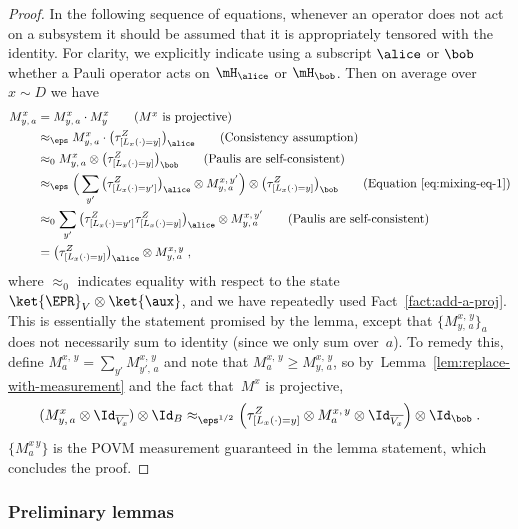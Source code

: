 \begin{proof}
	In the following sequence of equations, whenever an operator does not act on a
  subsystem it should be assumed that it is appropriately tensored with the
  identity.
  For clarity, we explicitly indicate using a subscript $\alice$ or $\bob$
  whether a Pauli operator acts on $\mH_\alice$ or $\mH_\bob$.
  Then on average over $x\sim D$ we have
  \begin{align*}
    M^{x}_{y, \, a}
    & =  M^{x}_{y, \, a} \cdot M^{x}_y  \tag{$M^x$ is projective}\\
    & \approx_\eps  M^{x}_{y, \, a} \cdot \big(
      \tau^Z_{[L_x(\cdot)=y]}\big)_\alice
      \tag{Consistency assumption}\\
    & \approx_0 M^x_{y, \, a} \otimes \big(\tau^Z_{[L_x(\cdot)=y]}\big)_\bob
      \tag{Paulis are self-consistent}\\
    & \approx_\eps \Big( \sum_{y'} \big(\tau^Z_{[L_x(\cdot) = y']}\big)_\alice
      \otimes  M^{x,\, y'}_{y,\, a} \Big) \otimes \big(\tau^Z_{[L_x(\cdot)=y]}
      \big)_\bob \tag{Equation~\eqref{eq:mixing-eq-1}}\\
    & \approx_0 \sum_{y'} \big(\tau^Z_{[L_x(\cdot) =
      y']}\tau^Z_{[L_x(\cdot)=y]}\big)_\alice \otimes  M^{x,\, y'}_{y,\, a}
      \tag{Paulis are self-consistent} \\
    & = \big( \tau^Z_{[L_x(\cdot) = y]} \big)_\alice
      \otimes M^{x,\, y}_{y,\, a} \;,
  \end{align*}
  where $\approx_0$ indicates equality with respect to the state $\ket{\EPR}_{V}
  \otimes \ket{\aux}$, and we have repeatedly used Fact~\ref{fact:add-a-proj}.
  This is essentially the statement promised by the lemma, except that
  $\{M^{x,\, y}_{y,\, a}\}_a$ does not necessarily sum to identity (since we
  only sum over~$a$).
  To remedy this, define $M^{x,\, y}_a = \sum_{y'} M^{x,\, y}_{y',\, a}$ and note
  that $M^{x,\, y}_{a} \geq M^{x,\, y}_{y,\, a}$, so
  by~Lemma~\ref{lem:replace-with-measurement} and the fact that~$M^x$ is
  projective,
  \begin{equation}\label{eq:mixing-eq-2}
    (M^{x}_{y,\, a} \otimes \Id_{\overline{V_x}}) \otimes \Id_{B} \approx_{\eps^{1/2}}
    \Bigl(\tau^Z_{[L_x(\cdot) = y]} \otimes M^{x,\, y}_a \otimes \Id_{\overline{V_x}}\Bigr)
    \otimes \Id_\bob\;.
  \end{equation}
  $\{M^{x\,y}_a\}$ is the POVM measurement guaranteed in the lemma statement,
  which concludes the proof.
\end{proof}


\subsubsection{Preliminary lemmas}

